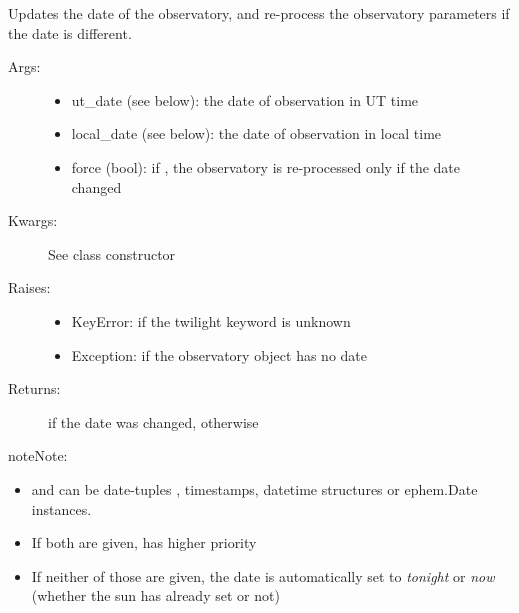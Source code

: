 \documentclass[letterpaper,10pt,english]{sphinxmanual}
\begin{document}
\begin{fulllineitems}
\begin{fulllineitems}
\end{fulllineitems}


\begin{fulllineitems}
\label{astroobs:astroobs.Observatory.Observatory.upd_date}
Updates the date of the observatory, and re-process the observatory parameters if the date is different.
\begin{description}
\item[{Args:}] \leavevmode\begin{itemize}
\item {} 
ut\_date (see below): the date of observation in UT time

\item {} 
local\_date (see below): the date of observation in local time

\item {} 
force (bool): if , the observatory is re-processed only if the date changed

\end{itemize}

\item[{Kwargs:}] \leavevmode
See class constructor

\item[{Raises:}] \leavevmode\begin{itemize}
\item {} 
KeyError: if the twilight keyword is unknown

\item {} 
Exception: if the observatory object has no date

\end{itemize}

\item[{Returns:}] \leavevmode
{} if the date was changed, otherwise 

\end{description}

\begin{notice}{note}{Note:}\begin{itemize}
\item {} 
 and  can be date-tuples , timestamps, datetime structures or ephem.Date instances.

\item {} 
If both are given,  has higher priority

\item {} 
If neither of those are given, the date is automatically set to \emph{tonight} or \emph{now} (whether the sun has already set or not)

\end{itemize}
\end{notice}

\end{fulllineitems}


\end{fulllineitems}
\end{document}
